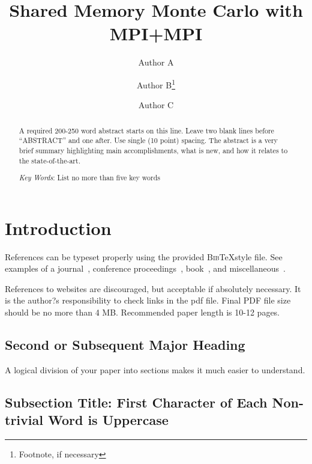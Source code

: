 \documentclass{mc2015}
\begin{document}
\title{Shared Memory Monte Carlo with MPI+MPI}

\author{Author A}
\author{Author B\footnote{Footnote, if necessary}}

\author{Author C}

\maketitle

\begin{abstract}
A required 200-250 word abstract starts on this line.  Leave two blank lines before ``ABSTRACT'' and one after.  
Use single (10 point) spacing.  
The abstract is a very brief summary highlighting main accomplishments, what is new, and how it relates to the state-of-the-art.

\emph{Key Words}: List no more than five key words
\end{abstract}

\section{Introduction}

References can be typeset properly using the provided \textsc{Bib}\TeX style
file. See examples of a journal~\cite{journal}, conference
proceedings~\cite{proceedings}, book~\cite{book}, and
miscellaneous~\cite{misc}.

References to websites are discouraged, but acceptable if absolutely necessary.  It is the author?s responsibility to check links in the pdf file.
Final PDF file size should be no more than 4 MB.  Recommended paper length is 10-12 pages.

\subsection{Second or Subsequent Major Heading}

A logical division of your paper into sections makes it much easier to understand.    

\subsection{Subsection Title: First Character of Each Non-trivial Word is Uppercase}
\end{document}

